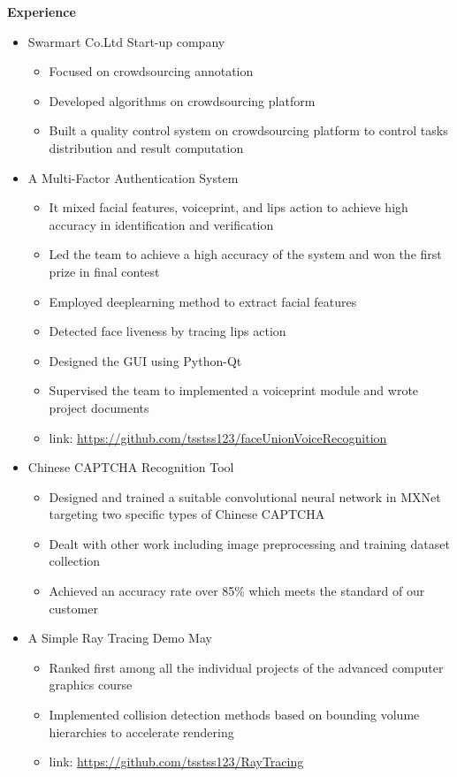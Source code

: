 \documentclass{mcmthesis}
\begin{document}
\textbf{Experience}

\begin{itemize}
	\item Swarmart Co.Ltd Start-up company
	\begin{itemize}
		\item Focused on crowdsourcing annotation
		\item Developed algorithms on crowdsourcing platform
		\item Built a quality control system on crowdsourcing platform to control tasks distribution and result computation
	\end{itemize}
	\item A Multi-Factor Authentication System
	\begin{itemize}
		\item It mixed facial features, voiceprint, and lips action to achieve high accuracy in identification and verification
		\item Led the team to achieve a high accuracy of the system and won the first prize in final contest
		\item Employed deeplearning method to extract facial features
		\item Detected face liveness by tracing lips action
		\item Designed the GUI using Python-Qt
		\item Supervised the team to implemented a voiceprint module and wrote project documents
		\item link: \url{https://github.com/tsstss123/faceUnionVoiceRecognition}
	\end{itemize}
	\item Chinese CAPTCHA Recognition Tool
	\begin{itemize}
		\item Designed and trained a suitable convolutional neural network in MXNet targeting two specific types of Chinese CAPTCHA
		\item Dealt with other work including image preprocessing and training dataset collection
		\item Achieved an accuracy rate over 85\% which meets the standard of our customer
	\end{itemize}
	\item A Simple Ray Tracing Demo May
	\begin{itemize}
		\item Ranked first among all the individual projects of the advanced computer graphics course
		\item Implemented collision detection methods based on bounding volume hierarchies to accelerate rendering
		\item link: \url{https://github.com/tsstss123/RayTracing}
	\end{itemize}
\end{itemize}
\end{document}
